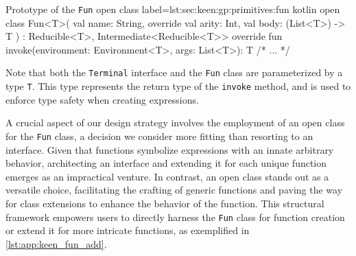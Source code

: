   \begin{code}{Prototype of the \texttt{Fun} open class}{
    label=lst:sec:keen:gp:primitives:fun
  }{kotlin}
    open class Fun<T>(
        val name: String, override val arity: Int, val body: (List<T>) -> T
    ) : Reducible<T>, Intermediate<Reducible<T>> {
        override fun invoke(environment: Environment<T>, args: List<T>): T { /* ... */ }
    }
  \end{code}

  Note that both the \texttt{Terminal} interface and the \texttt{Fun} class
  are parameterized by a type \texttt{T}. This type represents the return
  type of the \texttt{invoke} method, and is used to enforce type safety
  when creating expressions.

  A crucial aspect of our design strategy involves the employment of an open 
  class for the \texttt{Fun} class, a decision we consider more fitting than 
  resorting to an interface. Given that functions symbolize expressions with 
  an innate arbitrary behavior, architecting an interface and extending it 
  for each unique function emerges as an impractical venture. In contrast, an 
  open class stands out as a versatile choice, facilitating the crafting of 
  generic functions and paving the way for class extensions to enhance the 
  behavior of the function. This structural framework empowers users to 
  directly harness the \texttt{Fun} class for function creation or extend it 
  for more intricate functions, as exemplified in \vref{lst:app:keen_fun_add}.